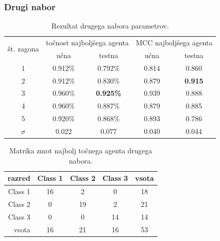 \subsubsection{Drugi nabor}
\begin{table}[H]
    \caption{Rezultat drugega nabora parametrov.}
    \begin{center}
        \begin{tabular}{|| c | c c || c c ||}
            \hline
            \multirow{2}{*}{št. zagona} & \multicolumn{2}{c||}{točnost najboljšega agenta} & \multicolumn{2}{c||}{MCC najboljšega agenta} \\ \cline{2-5}
            & učna    & testna           & učna  & testna         \\
            \hline
            1        & 0.912\% & 0.792\%          & 0.814 & 0.860          \\
            \hline
            2        & 0.912\% & 0.830\%          & 0.879 & \textbf{0.915} \\
            \hline
            3        & 0.960\% & \textbf{0.925\%} & 0.939 & 0.888          \\
            \hline
            4        & 0.960\% & 0.887\%          & 0.879 & 0.885          \\
            \hline
            5        & 0.920\% & 0.868\%          & 0.893 & 0.786          \\
            \hline
            $\sigma$ & 0.022   & 0.077            & 0.040 & 0.044          \\
            \hline
        \end{tabular}
    \end{center}
    \label{tab:wine_result_2}
\end{table}

\begin{table}[H]
    \centering
    \caption{Matrika zmot najbolj točnega agenta drugega nabora.}
    \begin{tabular}{||rcccc||}
        \hline
        razred  & Class 1 & Class 2 & Class 3 & vsota \\ \hline
        Class 1 & 16      & 2       & 0       & 18    \\ \hline
        Class 2 & 0       & 19      & 2       & 21    \\ \hline
        Class 3 & 0       & 0       & 14      & 14    \\ \hline
        vsota   & 16      & 21      & 16      & 53    \\ \hline
    \end{tabular}
    \label{tab:wine_acc_2}
\end{table}


